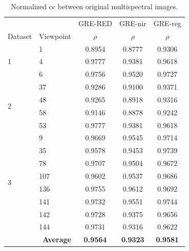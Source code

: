 \renewcommand{\arraystretch}{1.2}
\begin{table}
    \caption{Normalized \acrshort{cc} between original multispectral images. }
    \label{table:multispectral_base_correlation}
    \begin{tabular}{ll|c@{\hskip 0.2in}c@{\hskip 0.2in}c}
        \toprule
        & & GRE-RED & GRE-\acrshort{nir} & GRE-\acrshort{reg} \\
        \cmidrule{1-5}
        Dataset & Viewpoint & $\rho$ & $\rho$ & $\rho$ \\
        \cmidrule{1-5}
        \multirow{3}{*}{1} & 1 & 0.8954 & 0.8777 & 0.9306\\
        & 4 & 0.9777 & 0.9381 & 0.9618\\
        & 6 & 0.9756 & 0.9520 & 0.9727\\
        \cmidrule{1-5}
        \multirow{4}{*}{2} & 37 & 0.9286 & 0.9100 & 0.9371\\
        & 48 & 0.9265 & 0.8918 & 0.9316\\
        & 58 & 0.9146 & 0.8878 & 0.9242\\
        & 53 & 0.9777 & 0.9381 & 0.9618\\
        \cmidrule{1-5}
        \multirow{8}{*}{3} & 9 & 0.9669 & 0.9545 & 0.9714\\
        & 35 & 0.9578 & 0.9453 & 0.9739\\
        & 78 & 0.9707 & 0.9504 & 0.9672\\
        & 107 & 0.9602 & 0.9537 & 0.9686\\
        & 136 & 0.9755 & 0.9612 & 0.9692\\
        & 141 & 0.9732 & 0.9551 & 0.9744\\
        & 142 & 0.9728 & 0.9375 & 0.9656\\
        & 144 & 0.9731 & 0.9316 & 0.9622\\
        \cmidrule{1-5}
        \multicolumn{2}{r|}{\textbf{Average}} & \textbf{0.9564} & \textbf{0.9323} & \textbf{0.9581}\\
        \bottomrule
    \end{tabular}
    \normalsize
\end{table}
\renewcommand{\arraystretch}{1}

